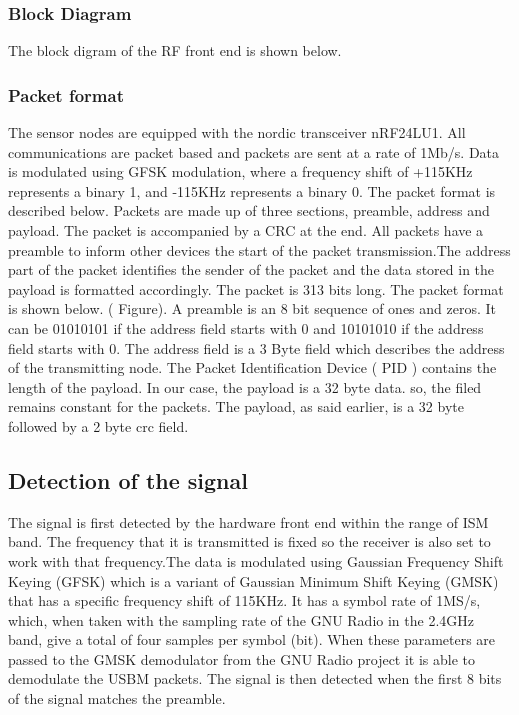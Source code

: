 \documentclass[a4paper,10pt]{article}
\begin{document}
\subsubsection{Block Diagram}
The block digram of the RF front end is shown below.
\subsubsection{Packet format}
The sensor nodes are equipped with the nordic transceiver nRF24LU1.
All communications are packet based and packets are sent at a rate
of 1Mb/s. Data is modulated using GFSK modulation, where a frequency
shift of +115KHz represents a binary 1, and -115KHz represents a
binary 0. The packet format is described below. \newline Packets are
made up of three sections, preamble, address and payload. The packet
is accompanied by a CRC at the end. All packets have a preamble to
inform other devices the start of the packet transmission.The
address part of the packet identifies the sender of the packet and
the data stored in the payload is formatted accordingly. The packet
is 313 bits long. The packet format is shown below. ( Figure). A
preamble is an 8 bit sequence of ones and zeros. It can be 01010101
if the address field starts with 0 and 10101010 if the address field
starts with 0. The address field is a 3 Byte field which describes
the address of the transmitting node. The Packet Identification
Device ( PID ) contains the length of the payload. In our case, the
payload is a 32 byte data. so, the filed remains constant for the
packets. The payload, as said earlier, is a
 32 byte followed by a 2 byte crc field.
\subsection{Detection of the signal}
The signal is first detected by the hardware front end within the
range of ISM band. The frequency that it is transmitted is fixed so
the receiver is also set to work with that frequency.The data is
modulated using Gaussian Frequency Shift Keying (GFSK) which is a
variant of Gaussian Minimum Shift Keying (GMSK) that has a specific
frequency shift of 115KHz. It has a symbol rate of 1MS/s, which,
when taken with the sampling rate of the GNU Radio in the 2.4GHz
band, give a total of four samples per symbol (bit). When these
parameters are passed to the GMSK demodulator from the GNU Radio
project it is able to demodulate the USBM packets. The signal is
then detected when the first 8 bits of the signal matches the
preamble.
\end{document}
